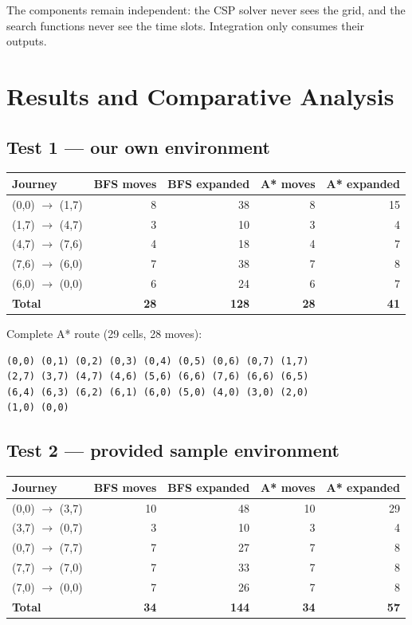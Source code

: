 \documentclass[11pt,a4paper]{article}
\begin{document}
The components remain independent: the CSP solver never sees the grid, and the search
functions never see the time slots. Integration only consumes their outputs.

\section{Results and Comparative Analysis}

\subsection{Test 1 --- our own environment}

\begin{center}
\begin{tabular}{@{}p{3.2cm}rrrr@{}}
\toprule
Journey & BFS moves & BFS expanded & A* moves & A* expanded \\
\midrule
(0,0) $\to$ (1,7) & 8 & 38 & 8 & 15 \\
(1,7) $\to$ (4,7) & 3 & 10 & 3 & 4 \\
(4,7) $\to$ (7,6) & 4 & 18 & 4 & 7 \\
(7,6) $\to$ (6,0) & 7 & 38 & 7 & 8 \\
(6,0) $\to$ (0,0) & 6 & 24 & 6 & 7 \\
\midrule
\textbf{Total} & \textbf{28} & \textbf{128} & \textbf{28} & \textbf{41} \\
\bottomrule
\end{tabular}
\end{center}

Complete A* route (29 cells, 28 moves):
\begin{verbatim}
(0,0) (0,1) (0,2) (0,3) (0,4) (0,5) (0,6) (0,7) (1,7)
(2,7) (3,7) (4,7) (4,6) (5,6) (6,6) (7,6) (6,6) (6,5)
(6,4) (6,3) (6,2) (6,1) (6,0) (5,0) (4,0) (3,0) (2,0)
(1,0) (0,0)
\end{verbatim}

\subsection{Test 2 --- provided sample environment}

\begin{center}
\begin{tabular}{@{}p{3.2cm}rrrr@{}}
\toprule
Journey & BFS moves & BFS expanded & A* moves & A* expanded \\
\midrule
(0,0) $\to$ (3,7) & 10 & 48 & 10 & 29 \\
(3,7) $\to$ (0,7) & 3 & 10 & 3 & 4 \\
(0,7) $\to$ (7,7) & 7 & 27 & 7 & 8 \\
(7,7) $\to$ (7,0) & 7 & 33 & 7 & 8 \\
(7,0) $\to$ (0,0) & 7 & 26 & 7 & 8 \\
\midrule
\textbf{Total} & \textbf{34} & \textbf{144} & \textbf{34} & \textbf{57} \\
\bottomrule
\end{tabular}
\end{center}
\end{document}
